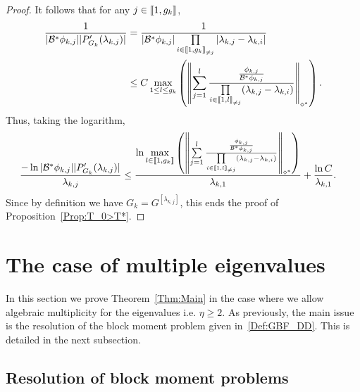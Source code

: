 \documentclass[10pt]{amsart}
\theoremstyle{definition}\newtheorem{defi}[theo]{Definition}\newtheorem{rema}[theo]{Remark}\newtheorem{exam}[theo]{Example}\newtheorem{exem}[theo]{Example}\newtheorem{nota}[theo]{Notation}
\newcommand{\llbracket}{\mathopen{[\mkern -2.7mu[}}
\newcommand{\rrbracket}{\mathclose{]\mkern -2.7mu]}}
\newcommand{\inter}[2]{\llbracket #1,#2 \rrbracket}
\newcommand{\interexclu}[3]{\llbracket #1,#2\rrbracket_{\neq #3}}
\newcommand\Bs{\mathcal{B}^*}
\newcommand{\normeXalphas}[1]{\left\| #1 \right\|_{\diamond^*}}
\newcommand{\n}{g}
\begin{document}
\begin{proof}
It follows that for any $j \in \inter{1}{\n_k}$,
\begin{align*}
\frac{1}{ | \Bs\phi_{k,j} | | P_{G_k}'(\lambda_{k,j}) | } &= \frac{1}{ | \Bs \phi_{k,j} | \prod\limits_{i\in \interexclu{1}{\n_k}{j}}|\lambda_{k,j}-\lambda_{k,i} | }
\\
&\leq C \max\limits_{1 \leq l \leq \n_k} \left(\normeXalphas{ \sum\limits_{j=1}^{l} \frac{ \frac{\phi_{k,j}}{\Bs \phi_{k,j}}}{\prod\limits_{i\in \interexclu{1}{l}{j} } (\lambda_{k,j}-\lambda_{k,i})} } \right).
\end{align*}
Thus, taking the logarithm,
\begin{align*}
\frac{-\ln | \Bs \phi_{k,j} | | P_{G_k}'(\lambda_{k,j}) |}{\lambda_{k,j}} &\leq \frac{\ln \max\limits_{l\in \inter{1}{\n_k} } \left(\normeXalphas{ \sum\limits_{j=1}^{l} \frac{ \frac{\phi_{k,j}}{\Bs \phi_{k,j}}}{\prod\limits_{i\in \interexclu{1}{l}{j}} (\lambda_{k,j}-\lambda_{k,i})} } \right)}{\lambda_{k,1}} + \frac{\ln C}{\lambda_{k,1}}.
\end{align*}
Since by definition we have $G_k=G^{[\lambda_{k,j}]}$, this ends the proof of Proposition~\ref{Prop:T_0>T*}.
\end{proof}



\section{The case of multiple eigenvalues}\label{Sec:ValPropresMultiples}

In this section we prove Theorem~\ref{Thm:Main} in the case where we allow algebraic multiplicity for the eigenvalues i.e. $\eta \geq 2$. As previously, the main issue is the resolution of the block moment problem given in~\eqref{Def:GBF_DD}. This is detailed in the next subsection.



\subsection{Resolution of block moment problems}
\end{document}
